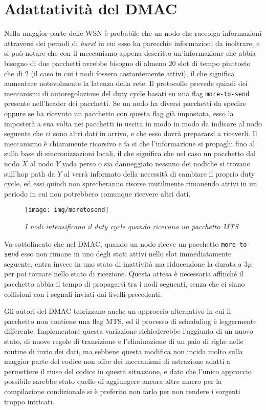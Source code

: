 \documentclass[twoside,11pt,a4paper,italian,openany]{book}
\begin{document}
\section{Adattatività del DMAC}
Nella maggior parte delle WSN è probabile che un nodo che raccolga informazioni attraversi dei
periodi di \emph{burst} in cui esso ha parecchie informazioni da inoltrare, e si può notare che 
con il meccanismo appena descritto un'informazione che abbia bisogno di due pacchetti avrebbe 
bisogno di almeno $20$ slot di tempo piuttosto che di $2$ (il caso in cui i nodi fossero 
costantemente attivi), il che significa aumentare notevolmente la latenza della rete. 
Il protocollo prevede quindi dei meccanismi di autoregolazione del duty cycle basati su una flag 
\texttt{more-to-send} presente nell'header dei pacchetti. 
Se un nodo ha diversi pacchetti da spedire oppure se ha ricevuto un pacchetto con questa flag
già impostata, esso la imposterà a sua volta nei pacchetti in uscita in modo in modo da 
indicare al nodo seguente che ci sono altri dati in arrivo, e che esso dovrà prepararsi a 
riceverli. Il meccanismo è chiaramente ricorsivo e fa si che l'informazione si propaghi fino 
al \sink sulla base di sincronizzazioni locali, il che significa che nel caso un pacchetto dal 
nodo $X$ al nodo $Y$ vada perso o sia danneggiato nessuno dei nodiche si trovano sull'hop path da
$Y$ al \sink verrà informato della necessità di cambiare il proprio duty cycle, ed essi quindi 
non sprecheranno risorse inutilmente rimanendo attivi in un periodo in cui non potrebbero 
comunque ricevere altri dati. 
\begin{figure}
\texttt{[image: img/moretosend]}
\caption{\emph{I nodi intensificano il duty cycle quando ricevono un pacchetto MTS}}
\end{figure}

Va sottolineato che nel DMAC, quando un nodo riceve un pacchetto \texttt{more-to-send} esso non 
rimane in uno degli stati attivi nello slot immediatamente seguente, entra invece in uno stato di
inattività ma riducendone la durata a  
$3\mu$ per poi tornare nello stato di ricezione. Questa attesa è necessaria affinché il 
pacchetto abbia il tempo di propagarsi tra i nodi seguenti, senza che ci siano collisioni con i
segnali inviati dai livelli precedenti. 

Gli autori del DMAC teorizzano anche un approccio alternativo in cui il pacchetto non contiene 
una flag MTS,  ed il processo di scheduling è leggermente differente. 
Implementare questa variazione richiederebbe l'aggiunta di un nuovo stato, di 
nuove regole di transizione e l'eliminazione di un paio di righe nelle routine di invio dei dati,
ma sebbene questa modifica non incida molto sulla maggior parte del codice \nesc non offre dei 
meccanismi di astrazione adatti a permettere il riuso del codice in questa situazione, e dato 
che l'unico approccio possibile sarebbe stato quello di aggiungere ancora altre macro 
per la compilazione condizionale si è preferito non farlo per non rendere i sorgenti troppo 
intricati. 
\end{document}
